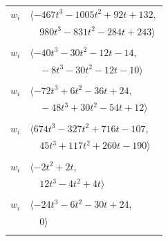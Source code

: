 \documentclass[11pt]{article}
\begin{document}
\begin{longtable}{@{}ll@{}}
$w_i$ & $\langle -467t^{3}-1005t^{2}+92t+132,$\\
 & $\quad 980t^{3}-831t^{2}-284t+243\rangle$\\
\addlinespace[2pt]
\multicolumn{2}{@{}p{0.97\textwidth}@{}}{$i=27$, $D_i=2$, $\rho_{ij}$: $2{:}1, \allowbreak 7{:}1, \allowbreak 9{:}1, \allowbreak 11{:}1, \allowbreak 13{:}1, \allowbreak 14{:}2, \allowbreak 35{:}2, \allowbreak 38{:}2, \allowbreak 39{:}1$}\\
$w_i$ & $\langle -40t^{3}-30t^{2}-12t-14,$\\
 & $\quad -8t^{3}-30t^{2}-12t-10\rangle$\\
\addlinespace[2pt]
\multicolumn{2}{@{}p{0.97\textwidth}@{}}{$i=28$, $D_i=6$, $\rho_{ij}$: $4{:}1, \allowbreak 7{:}1, \allowbreak 11{:}2, \allowbreak 12{:}1, \allowbreak 19{:}1, \allowbreak 23{:}2, \allowbreak 25{:}2, \allowbreak 33{:}2, \allowbreak 35{:}1$}\\
$w_i$ & $\langle -72t^{3}+6t^{2}-36t+24,$\\
 & $\quad -48t^{3}+30t^{2}-54t+12\rangle$\\
\addlinespace[2pt]
\multicolumn{2}{@{}p{0.97\textwidth}@{}}{$i=29$, $D_i=36$, $\rho_{ij}$: $6{:}2, \allowbreak 15{:}1, \allowbreak 16{:}1, \allowbreak 19{:}2, \allowbreak 23{:}2, \allowbreak 30{:}2, \allowbreak 31{:}2, \allowbreak 33{:}1, \allowbreak 39{:}2, \allowbreak 43{:}2$}\\
$w_i$ & $\langle 674t^{3}-327t^{2}+716t-107,$\\
 & $\quad 45t^{3}+117t^{2}+260t-190\rangle$\\
\addlinespace[2pt]
\multicolumn{2}{@{}p{0.97\textwidth}@{}}{$i=30$, $D_i=2$, $\rho_{ij}$: $4{:}2, \allowbreak 6{:}1, \allowbreak 8{:}1, \allowbreak 13{:}2, \allowbreak 15{:}1, \allowbreak 29{:}1, \allowbreak 31{:}1$}\\
$w_i$ & $\langle -2t^{2}+2t,$\\
 & $\quad 12t^{3}-4t^{2}+4t\rangle$\\
\addlinespace[2pt]
\multicolumn{2}{@{}p{0.97\textwidth}@{}}{$i=31$, $D_i=2$, $\rho_{ij}$: $5{:}1, \allowbreak 8{:}1, \allowbreak 10{:}1, \allowbreak 12{:}2, \allowbreak 14{:}2, \allowbreak 26{:}1, \allowbreak 29{:}1, \allowbreak 30{:}2, \allowbreak 36{:}2$}\\
$w_i$ & $\langle -24t^{3}-6t^{2}-30t+24,$\\
 & $\quad 0\rangle$\\
\addlinespace[2pt]
\multicolumn{2}{@{}p{0.97\textwidth}@{}}{$i=32$, $D_i=6$, $\rho_{ij}$: $0{:}2, \allowbreak 3{:}1, \allowbreak 8{:}2, \allowbreak 9{:}2, \allowbreak 11{:}2, \allowbreak 12{:}2, \allowbreak 13{:}1, \allowbreak 15{:}1, \allowbreak 26{:}2, \allowbreak 38{:}2$}\\

\end{longtable}
\end{document}

